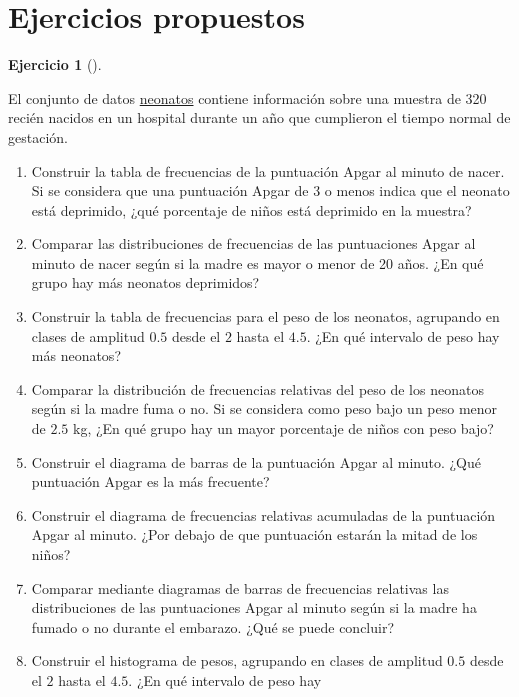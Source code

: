 \documentclass[
  spanish,
  a4paper,
]{scrreport}
\theoremstyle{definition}
\newtheorem{exercise}{Ejercicio}[chapter]
\theoremstyle{remark}
\begin{document}
\section{Ejercicios propuestos}\label{ejercicios-propuestos-2}

\begin{exercise}[]\protect\hypertarget{exr-frecuencias-graficos-neonatos}{}\label{exr-frecuencias-graficos-neonatos}

El conjunto de datos \href{datos/neonatos.csv}{neonatos} contiene
información sobre una muestra de 320 recién nacidos en un hospital
durante un año que cumplieron el tiempo normal de gestación.

\begin{enumerate}
\def\labelenumi{\alph{enumi}.}
\item
  Construir la tabla de frecuencias de la puntuación Apgar al minuto de
  nacer. Si se considera que una puntuación Apgar de 3 o menos indica
  que el neonato está deprimido, ¿qué porcentaje de niños está deprimido
  en la muestra?
\item
  Comparar las distribuciones de frecuencias de las puntuaciones Apgar
  al minuto de nacer según si la madre es mayor o menor de 20 años. ¿En
  qué grupo hay más neonatos deprimidos?
\item
  Construir la tabla de frecuencias para el peso de los neonatos,
  agrupando en clases de amplitud \(0.5\) desde el \(2\) hasta el
  \(4.5\). ¿En qué intervalo de peso hay más neonatos?
\item
  Comparar la distribución de frecuencias relativas del peso de los
  neonatos según si la madre fuma o no. Si se considera como peso bajo
  un peso menor de \(2.5\) kg, ¿En qué grupo hay un mayor porcentaje de
  niños con peso bajo?
\item
  Construir el diagrama de barras de la puntuación Apgar al minuto. ¿Qué
  puntuación Apgar es la más frecuente?
\item
  Construir el diagrama de frecuencias relativas acumuladas de la
  puntuación Apgar al minuto. ¿Por debajo de que puntuación estarán la
  mitad de los niños?
\item
  Comparar mediante diagramas de barras de frecuencias relativas las
  distribuciones de las puntuaciones Apgar al minuto según si la madre
  ha fumado o no durante el embarazo. ¿Qué se puede concluir?
\item
  Construir el histograma de pesos, agrupando en clases de amplitud
  \(0.5\) desde el \(2\) hasta el \(4.5\). ¿En qué intervalo de peso hay

\end{enumerate}
\end{exercise}
\end{document}
